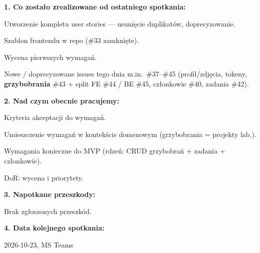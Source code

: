 \documentclass[a4paper,12pt]{article}
\begin{document}

\nextitem
\textbf{1. Co zostało zrealizowane od ostatniego spotkania:}
\par\vspace{0.3cm}
Utworzenie kompletu user stories --- usunięcie duplikatów, doprecyzowanie.

Szablon frontendu w repo (\#33 zamknięte).

Wycena pierwszych wymagań.

Nowe / doprecyzowane issues tego dnia m.in.\ \#37--\#45 (profil/zdjęcia, tokeny, \textbf{grzybobrania} \#43 + split FE \#44 / BE \#45, członkowie \#40, zadania \#42).

\nextitem
\textbf{2. Nad czym obecnie pracujemy:}
\par\vspace{0.3cm}
Kryteria akceptacji do wymagań.

Umieszczenie wymagań w kontekście domenowym (grzybobrania = projekty lab.).

Wymagania konieczne do MVP (rdzeń: CRUD grzybobrań + zadania + członkowie).

DoR: wycena i priorytety.

\nextitem
\textbf{3. Napotkane przeszkody:}
\par\vspace{0.3cm}
Brak zgłoszonych przeszkód.

\nextitem
\textbf{4. Data kolejnego spotkania:}
\par\vspace{0.3cm}
2026-10-23, MS Teams
\end{document}
